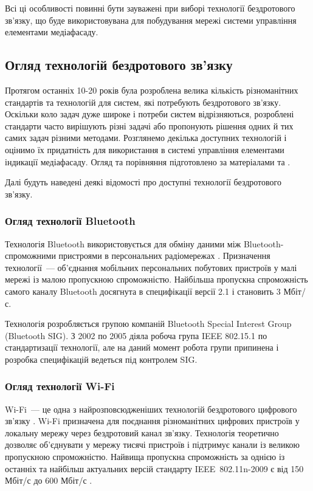 \documentclass[a4paper,ukrainian,utf8,nocolumnsxix,floatsection,equationsection]{eskdtext}
\renewcommand\paragraph{\subsubsection}
\begin{document}
Всі ці особливості повинні бути зауважені при виборі технології бездротового зв'язку, що буде використовувана для побудування мережі системи управління елементами медіафасаду.


\subsection{Огляд технологій бездротового зв'язку}

Протягом останніх 10-20 років була розроблена велика кількість різноманітних стандартів та технологій для систем, які потребують бездротового зв'язку. Оскільки коло задач дуже широке і потреби систем відрізняються, розроблені стандарти часто вирішують різні задачі або пропонують рішення одних й тих самих задач різними методами. Розглянемо декілька доступних технологій і оцінимо їх придатність для використання в системі управління елементами індикації медіафасаду. Огляд та порівняння підготовлено за матеріалами \cite{comparative:wireless:protocols} та \cite{garcia2008:problem:solving}.

Далі будуть наведені деякі відомості про доступні технології бездротового зв'язку.

\paragraph{Огляд технології Bluetooth} %
\label{par:bluetooth_bluetooth_low_energy}

Технологія Bluetooth використовується для обміну даними між Bluetooth-спроможними пристроями в персональних радіомережах \cite{garcia2008:problem:solving}. Призначення технології~--- об'єднання мобільних персональних побутових пристроїв у малі мережі із малою пропускною спроможністю. Найбільша пропускна спроможність самого каналу Bluetooth досягнута в специфікації версії 2.1 \cite{bluetooth:core:spec:2_1} і становить 3 Мбіт/с.

Технологія розробляється групою компаній Bluetooth Special Interest Group (Bluetooth SIG). З 2002 по 2005 діяла робоча група IEEE 802.15.1 по стандартизації технології, але на даний момент робота групи припинена і розробка специфікацій ведеться під контролем SIG.


\paragraph{Огляд технології Wi-Fi} %
\label{par:wi_fi}

Wi-Fi~--- це одна з найрозповсюдженіших технологій бездротового цифрового зв'язку \cite{garcia2008:problem:solving}. Wi-Fi призначена для поєднання різноманітних цифрових пристроїв у локальну мережу через бездротовий канал зв'язку. Технологія теоретично дозволяє об'єднувати у мережу тисячі пристроїв і підтримує канали із великою пропускною спроможністю. Найвища пропускна спроможність за однією із останніх та найбільш актуальних версій стандарту IEEE~802.11n-2009 є від 150 Мбіт/с до 600 Мбіт/с \cite{comparative:wireless:protocols}.
\end{document}
